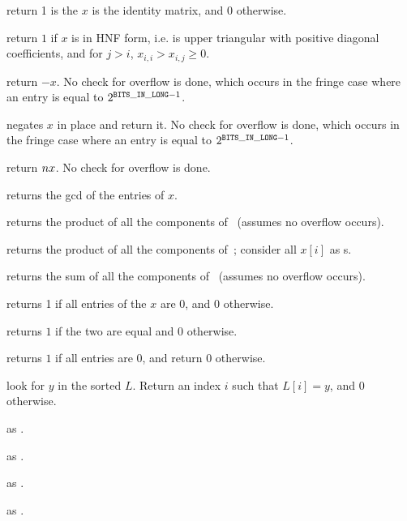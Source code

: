  return 1 is the  $x$ is the
identity matrix, and 0 otherwise.

 return $1$ if $x$ is in HNF form, i.e. is upper
triangular with positive diagonal coefficients, and  for $j>i$,
$x_{i,i}>x_{i,j} \ge 0$.


 return $-x$. No check for overflow is done, which
occurs in the fringe case where an entry is equal to $2^{{\tt BITS\_IN\_LONG}-1}$.

 negates $x$ in place and return it. No check
for overflow is done, which occurs in the fringe case where an entry is equal
to $2^{{\tt BITS\_IN\_LONG}-1}$.



 return $n\*x$. No check for overflow is
done.

 returns the gcd of the entries of $x$.


 returns the product of all the components
of~ (assumes no overflow occurs).

 returns the product of all the components
of~; consider all $x[i]$ as s.

 returns the sum of all the components
of~ (assumes no overflow occurs).

 returns 1 if all entries of the  $x$ are $0$,
and $0$ otherwise.

 returns $1$ if the two  are equal
and $0$ otherwise.

 returns $1$ if all entries are $0$, and return
$0$ otherwise.

 look for $y$ in the sorted
 $L$. Return an index $i$ such that $L[i] = y$, and  $0$ otherwise.

 as .

 as .

 as .

 as .

